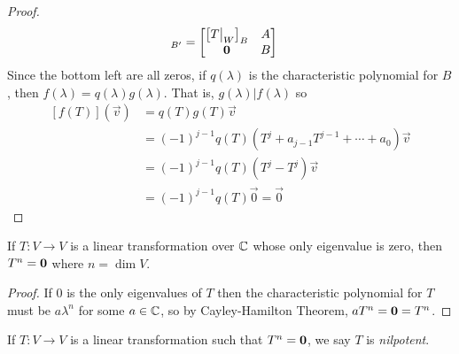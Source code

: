 \begin{proof}
  \begin{align}
    [T]_{B'} &= \bmatr{
      \left[T\big\rvert_{W}\right]_B & A \\
      {\bf 0} & B
    }
  \end{align}
  Since the bottom left are all zeros, if $q(\lambda)$ is the characteristic polynomial for $B$,
  then $f(\lambda) = q(\lambda)g(\lambda)$. That is, $g(\lambda) \vert f(\lambda)$ so
  \begin{align}
    \left[f(T)\right](\vec v) &= q(T)g(T)\vec v \\
      &= (-1)^{j-1}q(T)(T^j + a_{j-1}T^{j-1} + \cdots + a_0)\vec v \\
      &= (-1)^{j-1}q(T)(T^j - T^j)\vec v \\
      &= (-1)^{j-1}q(T)\vec 0 = \vec 0
  \end{align}
\end{proof}
\begin{corollary}
  If $T : V \to V$ is a linear transformation over $\mathbb{C}$ whose only eigenvalue is zero,
  then $T^n = {\bf 0}$ where $n = \dim V$.
\end{corollary}
\begin{proof}
  If 0 is the only eigenvalues of $T$ then the characteristic polynomial for $T$ must be $a\lambda^n$
  for some $a \in \mathbb{C}$, so by Cayley-Hamilton Theorem, $aT^n = {\bf 0} = T^n$.
\end{proof}
\begin{definition}[Nilpotency]
  If $T : V \to V$ is a linear transformation such that $T^n = {\bf 0}$, we say $T$ is \emph{nilpotent}.
\end{definition}
